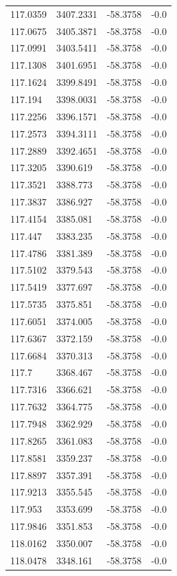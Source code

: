 \begin{table}[H]
\begin{tabular}{llll}
117.0359 & 3407.2331 & -58.3758 & -0.0 \\
117.0675 & 3405.3871 & -58.3758 & -0.0 \\
117.0991 & 3403.5411 & -58.3758 & -0.0 \\
117.1308 & 3401.6951 & -58.3758 & -0.0 \\
117.1624 & 3399.8491 & -58.3758 & -0.0 \\
117.194 & 3398.0031 & -58.3758 & -0.0 \\
117.2256 & 3396.1571 & -58.3758 & -0.0 \\
117.2573 & 3394.3111 & -58.3758 & -0.0 \\
117.2889 & 3392.4651 & -58.3758 & -0.0 \\
117.3205 & 3390.619 & -58.3758 & -0.0 \\
117.3521 & 3388.773 & -58.3758 & -0.0 \\
117.3837 & 3386.927 & -58.3758 & -0.0 \\
117.4154 & 3385.081 & -58.3758 & -0.0 \\
117.447 & 3383.235 & -58.3758 & -0.0 \\
117.4786 & 3381.389 & -58.3758 & -0.0 \\
117.5102 & 3379.543 & -58.3758 & -0.0 \\
117.5419 & 3377.697 & -58.3758 & -0.0 \\
117.5735 & 3375.851 & -58.3758 & -0.0 \\
117.6051 & 3374.005 & -58.3758 & -0.0 \\
117.6367 & 3372.159 & -58.3758 & -0.0 \\
117.6684 & 3370.313 & -58.3758 & -0.0 \\
117.7 & 3368.467 & -58.3758 & -0.0 \\
117.7316 & 3366.621 & -58.3758 & -0.0 \\
117.7632 & 3364.775 & -58.3758 & -0.0 \\
117.7948 & 3362.929 & -58.3758 & -0.0 \\
117.8265 & 3361.083 & -58.3758 & -0.0 \\
117.8581 & 3359.237 & -58.3758 & -0.0 \\
117.8897 & 3357.391 & -58.3758 & -0.0 \\
117.9213 & 3355.545 & -58.3758 & -0.0 \\
117.953 & 3353.699 & -58.3758 & -0.0 \\
117.9846 & 3351.853 & -58.3758 & -0.0 \\
118.0162 & 3350.007 & -58.3758 & -0.0 \\
118.0478 & 3348.161 & -58.3758 & -0.0 \\

\end{tabular}
\end{table}

